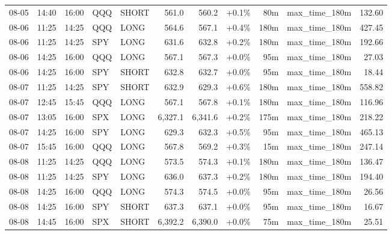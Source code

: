 \documentclass[11pt,a4paper,twoside]{article}
\begin{document}
\begin{center}
\begin{longtable}{>{\color{txtmain}}l l l l l r r r r >{\color{txtmain}}l r}
08-05 & 14:40 & 16:00 & QQQ & SHORT & 561.0 & 560.2 & \textcolor{wingreen}{+0.1\%} & 80m & max\_time\_180m & \textcolor{wingreen}{132.60} \\
08-06 & 11:25 & 14:25 & QQQ & LONG & 564.6 & 567.1 & \textcolor{wingreen}{+0.4\%} & 180m & max\_time\_180m & \textcolor{wingreen}{427.45} \\
08-06 & 11:25 & 14:25 & SPY & LONG & 631.6 & 632.8 & \textcolor{wingreen}{+0.2\%} & 180m & max\_time\_180m & \textcolor{wingreen}{192.66} \\
08-06 & 14:25 & 16:00 & QQQ & LONG & 567.1 & 567.3 & \textcolor{wingreen}{+0.0\%} & 95m & max\_time\_180m & \textcolor{wingreen}{27.03} \\
08-06 & 14:25 & 16:00 & SPY & SHORT & 632.8 & 632.7 & \textcolor{wingreen}{+0.0\%} & 95m & max\_time\_180m & \textcolor{wingreen}{18.44} \\
08-07 & 11:25 & 14:25 & SPY & SHORT & 632.9 & 629.3 & \textcolor{wingreen}{+0.6\%} & 180m & max\_time\_180m & \textcolor{wingreen}{558.82} \\
08-07 & 12:45 & 15:45 & QQQ & LONG & 567.1 & 567.8 & \textcolor{wingreen}{+0.1\%} & 180m & max\_time\_180m & \textcolor{wingreen}{116.96} \\
08-07 & 13:05 & 16:00 & SPX & LONG & 6,327.1 & 6,341.6 & \textcolor{wingreen}{+0.2\%} & 175m & max\_time\_180m & \textcolor{wingreen}{218.22} \\
08-07 & 14:25 & 16:00 & SPY & LONG & 629.3 & 632.3 & \textcolor{wingreen}{+0.5\%} & 95m & max\_time\_180m & \textcolor{wingreen}{465.13} \\
08-07 & 15:45 & 16:00 & QQQ & LONG & 567.8 & 569.2 & \textcolor{wingreen}{+0.3\%} & 15m & max\_time\_180m & \textcolor{wingreen}{247.14} \\
08-08 & 11:25 & 14:25 & QQQ & LONG & 573.5 & 574.3 & \textcolor{wingreen}{+0.1\%} & 180m & max\_time\_180m & \textcolor{wingreen}{136.47} \\
08-08 & 11:25 & 14:25 & SPY & LONG & 636.0 & 637.3 & \textcolor{wingreen}{+0.2\%} & 180m & max\_time\_180m & \textcolor{wingreen}{194.40} \\
08-08 & 14:25 & 16:00 & QQQ & LONG & 574.3 & 574.5 & \textcolor{wingreen}{+0.0\%} & 95m & max\_time\_180m & \textcolor{wingreen}{26.56} \\
08-08 & 14:25 & 16:00 & SPY & SHORT & 637.3 & 637.1 & \textcolor{wingreen}{+0.0\%} & 95m & max\_time\_180m & \textcolor{wingreen}{16.67} \\
08-08 & 14:45 & 16:00 & SPX & SHORT & 6,392.2 & 6,390.0 & \textcolor{wingreen}{+0.0\%} & 75m & max\_time\_180m & \textcolor{wingreen}{25.51} \\

\end{longtable}
\end{center}
\end{document}
